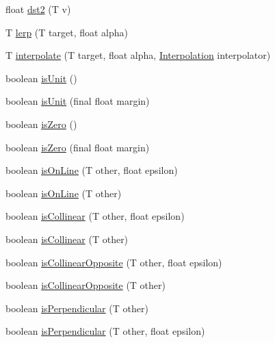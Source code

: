 \begin{DoxyCompactItemize}
\item 
float \hyperlink{interfaceairhockeyjava_1_1util_1_1_i_vector_aa81f5d6f0e86b8a11835d133929d8b28}{dst2} (T v)
\item 
T \hyperlink{interfaceairhockeyjava_1_1util_1_1_i_vector_ac3736d023e80681dc92d30684651d38c}{lerp} (T target, float alpha)
\item 
T \hyperlink{interfaceairhockeyjava_1_1util_1_1_i_vector_a7e4c01e1b5876c1a1853479244ed7993}{interpolate} (T target, float alpha, \hyperlink{classairhockeyjava_1_1util_1_1_interpolation}{Interpolation} interpolator)
\item 
boolean \hyperlink{interfaceairhockeyjava_1_1util_1_1_i_vector_a31c91753325e5b946d515512ca26a979}{is\+Unit} ()
\item 
boolean \hyperlink{interfaceairhockeyjava_1_1util_1_1_i_vector_a118ab03352f415f8182e44bd019003c2}{is\+Unit} (final float margin)
\item 
boolean \hyperlink{interfaceairhockeyjava_1_1util_1_1_i_vector_ab66e17d6c63f3906a10a9af8f2c67271}{is\+Zero} ()
\item 
boolean \hyperlink{interfaceairhockeyjava_1_1util_1_1_i_vector_a1675d4266f46c958e569c09ff98f8e12}{is\+Zero} (final float margin)
\item 
boolean \hyperlink{interfaceairhockeyjava_1_1util_1_1_i_vector_a93db7c0dc352b0aca9f51b859f4528d1}{is\+On\+Line} (T other, float epsilon)
\item 
boolean \hyperlink{interfaceairhockeyjava_1_1util_1_1_i_vector_ad26fa114b6429f6f1523c0299a53db64}{is\+On\+Line} (T other)
\item 
boolean \hyperlink{interfaceairhockeyjava_1_1util_1_1_i_vector_a653ce0b0a97504da467237d9c9e70b5a}{is\+Collinear} (T other, float epsilon)
\item 
boolean \hyperlink{interfaceairhockeyjava_1_1util_1_1_i_vector_afc1a6031198eb0c2f8493ac4ee373af8}{is\+Collinear} (T other)
\item 
boolean \hyperlink{interfaceairhockeyjava_1_1util_1_1_i_vector_a6e5ba34fc4d9cfdcc448cf5ac34add12}{is\+Collinear\+Opposite} (T other, float epsilon)
\item 
boolean \hyperlink{interfaceairhockeyjava_1_1util_1_1_i_vector_aad1840dcc34d178328ec4ec7b45ff00a}{is\+Collinear\+Opposite} (T other)
\item 
boolean \hyperlink{interfaceairhockeyjava_1_1util_1_1_i_vector_a1bf7a3337c13777acc20405464304ee3}{is\+Perpendicular} (T other)
\item 
boolean \hyperlink{interfaceairhockeyjava_1_1util_1_1_i_vector_a591b7412fb93363ff990690d258d36d5}{is\+Perpendicular} (T other, float epsilon)

\end{DoxyCompactItemize}
